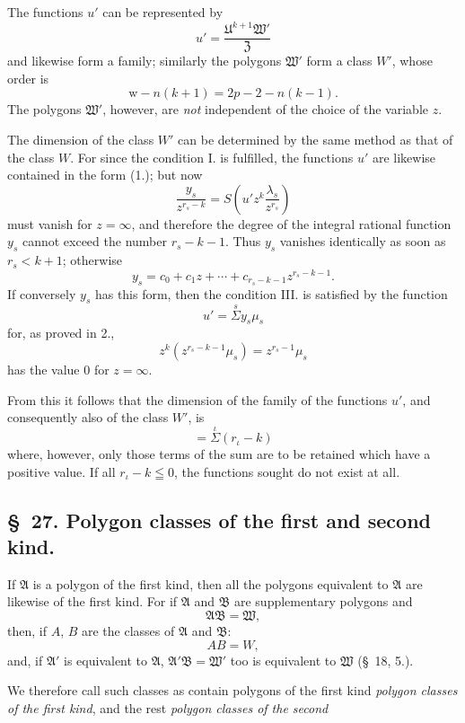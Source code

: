 \documentclass{article}
\begin{document}
The functions $u'$ can be represented by
\[ u' = \frac{\mathfrak{U}^{k+1}\mathfrak{W}'}{\mathfrak{Z}} \]
and likewise form a family; similarly the polygons $\mathfrak{W}'$ form a class $W'$, whose order is
\[ \mathrm{w}-n(k+1) = 2p-2-n(k-1). \]
The polygons $\mathfrak{W}'$, however, are \emph{not} independent of the choice of the variable $z$.

The dimension of the class $W'$ can be determined by the same method as that of the class $W$. For since the condition I. is fulfilled, the functions $u'$ are likewise contained in the form (1.); but now
\[ \frac{y_{s}}{z^{r_{s}-k}} = S\left(u'z^{k}\frac{\lambda_{s}}{z^{r_{s}}}\right) \]
must vanish for $z = \infty$, and therefore the degree of the integral rational function $y_{s}$ cannot exceed the number $r_{s}-k-1$. Thus $y_{s}$ vanishes identically as soon as $r_{s} < k+1$; otherwise
\[ y_{s} = c_{0} + c_{1}z + \cdots + c_{r_{s}-k-1}z^{r_{s}-k-1}. \tag{3.} \]
If conversely $y_{s}$ has this form, then the condition III. is satisfied by the function
\[ u' = \overset{s}{\Sigma} y_{s}\mu_{s} \]
for, as proved in 2.,
\[ z^{k}(z^{r_{s}-k-1}\mu_{s}) = z^{r_{s}-1}\mu_{s} \]
has the value 0 for $z = \infty$.

From this it follows that the dimension of the family of the functions $u'$, and consequently also of the class $W'$, is
\[ = \overset{\iota}{\Sigma}(r_{\iota}-k) \]
where, however, only those terms of the sum are to be retained which have a positive value. If all $r_{\iota}-k \leqq 0$, the functions sought do not exist at all.

\subsection*{§~27. Polygon classes of the first and second kind.}

If $\mathfrak{A}$ is a polygon of the first kind, then all the polygons equivalent to $\mathfrak{A}$ are likewise of the first kind. For if $\mathfrak{A}$ and $\mathfrak{B}$ are supplementary polygons and
\[ \mathfrak{A}\mathfrak{B} = \mathfrak{W}, \]
then, if $A$, $B$ are the classes of $\mathfrak{A}$ and $\mathfrak{B}$:
\[ AB = W, \]
and, if $\mathfrak{A}'$ is equivalent to $\mathfrak{A}$, $\mathfrak{A}'\mathfrak{B} = \mathfrak{W}'$ too is equivalent to $\mathfrak{W}$ (§~18, 5.).

We therefore call such classes as contain polygons of the first kind \emph{polygon classes of the first kind}, and the rest \emph{polygon classes of the second}
\end{document}

